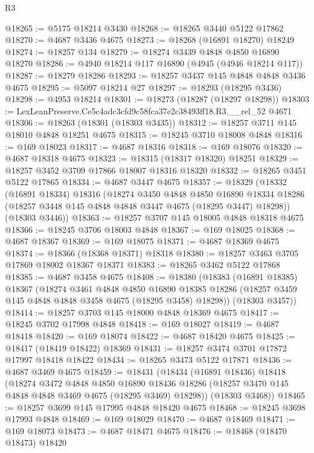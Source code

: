 \begin{lexlean}{R3}
\begin{coremodule}
@18265 := @5175 @18214 @3430
@18268 := @18265 @3440 @5122 @17862
@18270 := @4687 @3436 @4675
@18273 := @18268 (@16891 @18270) @18249
@18274 := @18257 @134
@18279 := @18274 @3439 @4848 @4850 @16890 @18270
@18286 := @4940 @18214 @117 @16890 (@4945 (@4946 @18214 @117))
@18287 := @18279 @18286
@18293 := @18257 @3437 @145 @4848 @4848 @3436 @4675
@18295 := @5097 @18214 @27
@18297 := @18293 (@18295 @3436)
@18298 := @4953 @18214
@18301 := @18273 (@18287 (@18297 @18298))
@18303 := LexLeanPreserve.Ce5c4adc3cfd9c58fca37e2c38493ff18.R3.__rel_52 @4671
@18306 := @18263 (@18301 (@18303 @3435))
@18312 := @18257 @3711 @145 @18010 @4848 @18251 @4675
@18315 := @18245 @3710 @18008 @4848
@18316 := @169 @18023
@18317 := @4687 @18316
@18318 := @169 @18076
@18320 := @4687 @18318 @4675
@18323 := @18315 (@18317 @18320) @18251
@18329 := @18257 @3452 @3709 @17866 @18007 @18316 @18320
@18332 := @18265 @3451 @5122 @17865
@18334 := @4687 @3447 @4675
@18357 := @18329
    (@18332
      (@16891 @18334)
      @18316
      (@18274
        @3450
        @4848
        @4850
        @16890
        @18334
        @18286
        (@18257 @3448 @145 @4848 @4848 @3447 @4675 (@18295 @3447) @18298))
      (@18303 @3446))
@18363 := @18257 @3707 @145 @18005 @4848 @18318 @4675
@18366 := @18245 @3706 @18003 @4848
@18367 := @169 @18025
@18368 := @4687 @18367
@18369 := @169 @18075
@18371 := @4687 @18369 @4675
@18374 := @18366 (@18368 @18371) @18318
@18380 := @18257 @3463 @3705 @17869 @18002 @18367 @18371
@18383 := @18265 @3462 @5122 @17868
@18385 := @4687 @3458 @4675
@18408 := @18380
    (@18383
      (@16891 @18385)
      @18367
      (@18274
        @3461
        @4848
        @4850
        @16890
        @18385
        @18286
        (@18257 @3459 @145 @4848 @4848 @3458 @4675 (@18295 @3458) @18298))
      (@18303 @3457))
@18414 := @18257 @3703 @145 @18000 @4848 @18369 @4675
@18417 := @18245 @3702 @17998 @4848
@18418 := @169 @18027
@18419 := @4687 @18418
@18420 := @169 @18074
@18422 := @4687 @18420 @4675
@18425 := @18417 (@18419 @18422) @18369
@18431 := @18257 @3474 @3701 @17872 @17997 @18418 @18422
@18434 := @18265 @3473 @5122 @17871
@18436 := @4687 @3469 @4675
@18459 := @18431
    (@18434
      (@16891 @18436)
      @18418
      (@18274
        @3472
        @4848
        @4850
        @16890
        @18436
        @18286
        (@18257 @3470 @145 @4848 @4848 @3469 @4675 (@18295 @3469) @18298))
      (@18303 @3468))
@18465 := @18257 @3699 @145 @17995 @4848 @18420 @4675
@18468 := @18245 @3698 @17993 @4848
@18469 := @169 @18029
@18470 := @4687 @18469
@18471 := @169 @18073
@18473 := @4687 @18471 @4675
@18476 := @18468 (@18470 @18473) @18420

\end{coremodule}
\end{lexlean}
